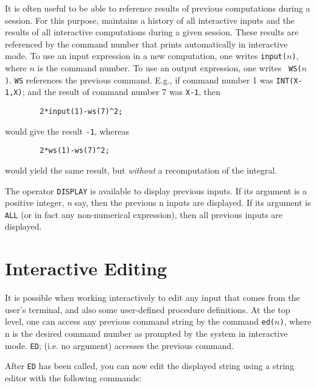 \hypertarget{reserved:INPUT}{}
\hypertarget{reserved:WS}{}
It is often useful to be able to reference results of previous
computations during a {\REDUCE} session.  For this purpose, {\REDUCE}
maintains a history of all interactive inputs and the
results of all interactive computations during a given session.  These
results are referenced by the command number that {\REDUCE} prints
automatically in interactive mode.  To use an input expression in a new
computation, one writes {\tt input(}$n${\tt )}, where
$n$ is the command number.  To use an output expression, one writes {\tt
WS(}$n${\tt )}. {\tt WS} references the previous command.
E.g., if command number 1 was {\tt INT(X-1,X)}; and the result of command
number 7 was {\tt X-1}, then
\begin{verbatim}
        2*input(1)-ws(7)^2;
\end{verbatim}
would give the result {\tt -1}, whereas
\begin{verbatim}
        2*ws(1)-ws(7)^2;
\end{verbatim}
would yield the same result, but {\em without\/} a recomputation of the
integral.

\hypertarget{operator:DISPLAY}{}
The operator {\tt DISPLAY} is available to display previous
inputs.  If its argument is a positive integer, {\it n} say, then the
previous n inputs are displayed.  If its argument is {\tt ALL} (or in fact
any non-numerical expression), then all previous inputs are displayed.

\section{Interactive Editing}
\hypertarget{command:ED}{}
It is possible when working interactively to edit any {\REDUCE} input that
comes from the user's terminal, and also some user-defined procedure
definitions.  At the top level, one can access any previous command string
by the command {\tt ed(}$n${\tt )}, where n is the desired
command number as prompted by the system in interactive mode. {\tt ED};
(i.e. no argument) accesses the previous command.

After {\tt ED} has been called, you can now edit the displayed string using a
string editor with the following commands:

